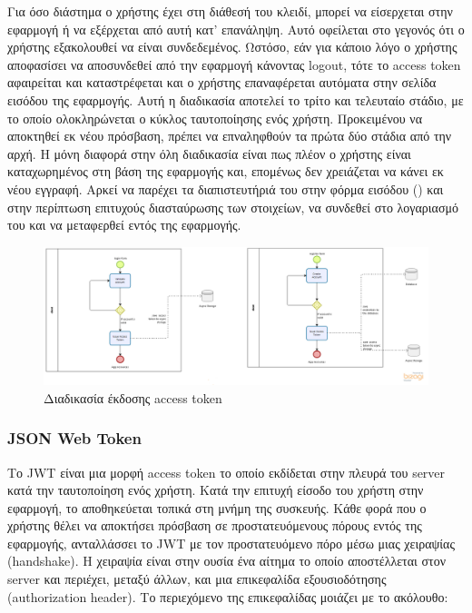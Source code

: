 Για όσο διάστημα ο χρήστης έχει στη διάθεσή του κλειδί, μπορεί να είσερχεται στην εφαρμογή ή να εξέρχεται από αυτή κατ' επανάληψη. Αυτό οφείλεται στο γεγονός ότι ο χρήστης εξακολουθεί να είναι συνδεδεμένος. Ωστόσο, εάν για κάποιο λόγο ο χρήστης αποφασίσει να αποσυνδεθεί από την εφαρμογή κάνοντας logout, τότε το access token αφαιρείται και καταστρέφεται και ο χρήστης επαναφέρεται αυτόματα στην σελίδα εισόδου της εφαρμογής. Αυτή η διαδικασία αποτελεί το τρίτο και τελευταίο στάδιο, με το οποίο ολοκληρώνεται ο κύκλος ταυτοποίησης ενός χρήστη. Προκειμένου να αποκτηθεί εκ νέου πρόσβαση, πρέπει να επναληφθούν τα πρώτα δύο στάδια από την αρχή. Η μόνη διαφορά στην όλη διαδικασία είναι πως πλέον ο χρήστης είναι καταχωρημένος στη βάση της εφαρμογής και, επομένως δεν χρειάζεται να κάνει εκ νέου εγγραφή. Αρκεί να παρέχει τα διαπιστευτήριά του στην φόρμα εισόδου () και στην περίπτωση επιτυχούς διασταύρωσης των στοιχείων, να συνδεθεί στο λογαριασμό του και να μεταφερθεί εντός της εφαρμογής.

\begin{figure}[h]
    \centering
    \includegraphics[scale=0.4]{figures/access-token.png}
    \caption{Διαδικασία έκδοσης access token}
    \label{accesstoken}
\end{figure}


\subsubsection{JSON Web Token}

Το JWT είναι μια μορφή access token το οποίο εκδίδεται στην πλευρά του server κατά την ταυτοποίηση ενός χρήστη. Κατά την επιτυχή είσοδο του χρήστη στην εφαρμογή, το  αποθηκεύεται τοπικά στη μνήμη της συσκευής. Κάθε φορά που ο χρήστης θέλει να αποκτήσει πρόσβαση σε προστατευόμενους πόρους εντός της εφαρμογής, ανταλλάσσει το JWT με τον προστατευόμενο πόρο μέσω μιας χειραψίας (handshake). Η χειραψία είναι στην ουσία ένα αίτημα το οποίο αποστέλλεται στον server και περιέχει, μεταξύ άλλων, και μια επικεφαλίδα εξουσιοδότησης (authorization header). Το περιεχόμενο της επικεφαλίδας μοιάζει με το ακόλουθο:

